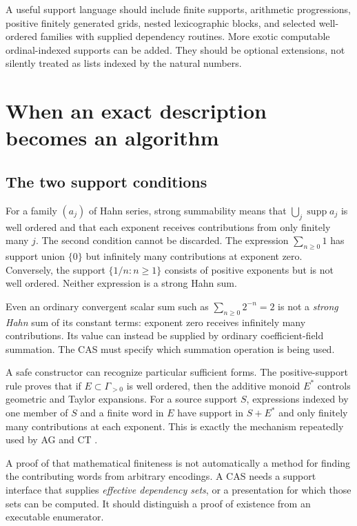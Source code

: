 \documentclass[11pt,letterpaper]{article}
\theoremstyle{definition}\newtheorem{definition}[theorem]{Definition}
\theoremstyle{remark}\newtheorem{remark}[theorem]{Remark}
\newcommand{\supp}{\operatorname{supp}}\newcommand{\lc}{\operatorname{lc}}
\numberwithin{equation}{section}\setcounter{tocdepth}{2}
\begin{document}
A useful support language should include finite supports, arithmetic progressions, positive finitely generated grids, nested lexicographic blocks, and selected well-ordered families with supplied dependency routines. More exotic computable ordinal-indexed supports can be added. They should be optional extensions, not silently treated as lists indexed by the natural numbers.

\section{When an exact description becomes an algorithm}\label{sec:effectivity}
\subsection{The two support conditions}
For a family $(a_j)$ of Hahn series, strong summability means that $\bigcup_j\supp a_j$ is well ordered and that each exponent receives contributions from only finitely many $j$. The second condition cannot be discarded. The expression $\sum_{n\ge0}1$ has support union $\{0\}$ but infinitely many contributions at exponent zero. Conversely, the support $\{1/n:n\ge1\}$ consists of positive exponents but is not well ordered. Neither expression is a strong Hahn sum.

Even an ordinary convergent scalar sum such as $\sum_{n\ge0}2^{-n}=2$ is not a \emph{strong Hahn} sum of its constant terms: exponent zero receives infinitely many contributions. Its value can instead be supplied by ordinary coefficient-field summation. The CAS must specify which summation operation is being used.

A safe constructor can recognize particular sufficient forms. The positive-support rule proves that if $E\subset\Gamma_{>0}$ is well ordered, then the additive monoid $E^*$ controls geometric and Taylor expansions. For a source support $S$, expressions indexed by one member of $S$ and a finite word in $E$ have support in $S+E^*$ and only finitely many contributions at each exponent. This is exactly the mechanism repeatedly used by AG and CT \cite{AG,CT}.

A proof of that mathematical finiteness is not automatically a method for finding the contributing words from arbitrary encodings. A CAS needs a support interface that supplies \emph{effective dependency sets}, or a presentation for which those sets can be computed. It should distinguish a proof of existence from an executable enumerator.
\end{document}
